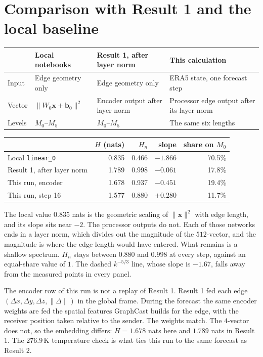 \documentclass[11pt]{article}
\begin{document}
\section{Comparison with Result 1 and the local baseline}

\noindent
\begin{tabularx}{\textwidth}{@{}lXXX@{}}
\toprule
& Local notebooks & Result 1, after layer norm & This calculation \\
\midrule
Input
  & Edge geometry only
  & Edge geometry only
  & ERA5 state, one forecast step \\
Vector
  & \(\|W_0\mathbf{x}+\mathbf{b}_0\|^2\)
  & Encoder output after layer norm
  & Processor edge output after its layer norm \\
Levels
  & \(M_0\)--\(M_5\)
  & \(M_0\)--\(M_5\)
  & The same six lengths \\
\bottomrule
\end{tabularx}

\begin{center}
\begin{tabular}{lrrrr}
\toprule
& \(H\) (nats) & \(H_n\) & slope & share on \(M_0\) \\
\midrule
Local \texttt{linear\_0} & 0.835 & 0.466 & \(-1.866\) & 70.5\% \\
Result 1, after layer norm & 1.789 & 0.998 & \(-0.061\) & 17.8\% \\
This run, encoder & 1.678 & 0.937 & \(-0.451\) & 19.4\% \\
This run, step 16 & 1.577 & 0.880 & \(+0.280\) & 11.7\% \\
\bottomrule
\end{tabular}
\end{center}

The local value \(0.835\) nats is the geometric scaling of \(\|\mathbf{x}\|^2\) with edge length, and its slope sits near \(-2\). The processor outputs do not. Each of those networks ends in a layer norm, which divides out the magnitude of the \(512\)-vector, and the magnitude is where the edge length would have entered. What remains is a shallow spectrum. \(H_n\) stays between \(0.880\) and \(0.998\) at every step, against an equal-share value of \(1\). The dashed \(k^{-5/3}\) line, whose slope is \(-1.67\), falls away from the measured points in every panel.

The encoder row of this run is not a replay of Result 1. Result 1 fed each edge \((\Delta x, \Delta y, \Delta z, \|\Delta\|)\) in the global frame. During the forecast the same encoder weights are fed the spatial features GraphCast builds for the edge, with the receiver position taken relative to the sender. The weights match. The \(4\)-vector does not, so the embedding differs: \(H = 1.678\) nats here and \(1.789\) nats in Result 1. The \(276.9\,\mathrm{K}\) temperature check is what ties this run to the same forecast as Result 2.
\end{document}
